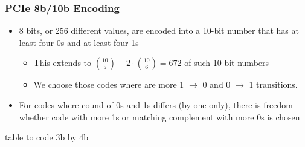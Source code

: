 \documentclass{beamer}
\begin{document}
\begin{frame}
\frametitle{PCIe 8b/10b Encoding}

\begin{itemize}
\item 8 bits, or 256 different values, are encoded into a 10-bit number that has at least four 0s and at least four 1s
\begin{itemize}
\item This extends to ${10 \choose 5} + 2\cdot {10 \choose 6}= 672$ of such 10-bit numbers
\item We choose those codes where are more 1 $\rightarrow$ 0 and 0 $\rightarrow$ 1 transitions.
\end{itemize}
\item For codes where cound of 0s and 1s differs (by one only), there is freedom whether code with more 1s or matching complement with more 0s is chosen
\end{itemize}

\bigskip
table to code 3b by 4b
\end{frame}
\end{document}

